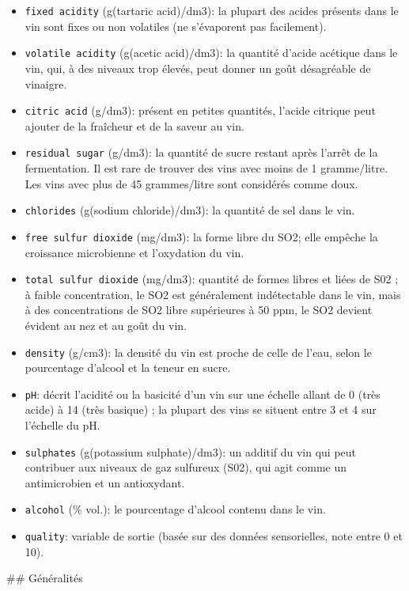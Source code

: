 \documentclass[11pt]{article}
\providecommand{\tightlist}{%
      \setlength{\itemsep}{0pt}\setlength{\parskip}{0pt}}
\begin{document}
\begin{itemize}
\tightlist
\item
  \texttt{fixed\ acidity} (g(tartaric acid)/dm3): la plupart des acides
  présents dans le vin sont fixes ou non volatiles (ne s'évaporent pas
  facilement).
\item
  \texttt{volatile\ acidity} (g(acetic acid)/dm3): la quantité d'acide
  acétique dans le vin, qui, à des niveaux trop élevés, peut donner un
  goût désagréable de vinaigre.
\item
  \texttt{citric\ acid} (g/dm3): présent en petites quantités, l'acide
  citrique peut ajouter de la fraîcheur et de la saveur au vin.
\item
  \texttt{residual\ sugar} (g/dm3): la quantité de sucre restant après
  l'arrêt de la fermentation. Il est rare de trouver des vins avec moins
  de 1 gramme/litre. Les vins avec plus de 45 grammes/litre sont
  considérés comme doux.
\item
  \texttt{chlorides} (g(sodium chloride)/dm3): la quantité de sel dans
  le vin.
\item
  \texttt{free\ sulfur\ dioxide} (mg/dm3): la forme libre du SO2; elle
  empêche la croissance microbienne et l'oxydation du vin.
\item
  \texttt{total\ sulfur\ dioxide} (mg/dm3): quantité de formes libres et
  liées de S02 ; à faible concentration, le SO2 est généralement
  indétectable dans le vin, mais à des concentrations de SO2 libre
  supérieures à 50 ppm, le SO2 devient évident au nez et au goût du vin.
\item
  \texttt{density} (g/cm3): la densité du vin est proche de celle de
  l'eau, selon le pourcentage d'alcool et la teneur en sucre.
\item
  \texttt{pH}: décrit l'acidité ou la basicité d'un vin sur une échelle
  allant de 0 (très acide) à 14 (très basique) ; la plupart des vins se
  situent entre 3 et 4 sur l'échelle du pH.
\item
  \texttt{sulphates} (g(potassium sulphate)/dm3): un additif du vin qui
  peut contribuer aux niveaux de gaz sulfureux (S02), qui agit comme un
  antimicrobien et un antioxydant.
\item
  \texttt{alcohol} (\% vol.): le pourcentage d'alcool contenu dans le
  vin.
\item
  \texttt{quality}: variable de sortie (basée sur des données
  sensorielles, note entre 0 et 10).
\end{itemize}

\#\# Généralités
\end{document}

